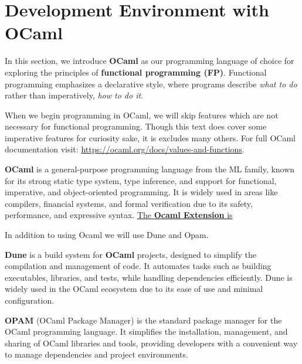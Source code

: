 
\newpage 
\section{Development Environment with OCaml}

In this section, we introduce \textbf{OCaml} as our programming language of choice for exploring
the principles of \textbf{functional programming (FP)}. Functional programming emphasizes a declarative
style, where programs describe \textit{what to do} rather than imperatively, \textit{how to do it}.

When we begin programming in OCaml, we will skip features which are not necessary for 
functional programming. Though this text does cover some imperative features for curiosity sake, it is excludes 
many others. For full OCaml documentation visit: \href{https://ocaml.org/docs/values-and-functions}{https://ocaml.org/docs/values-and-functions}.


\begin{Def}[OCaml]

	\textbf{OCaml} is a general-purpose programming language from the ML family,
	known for its strong static type system, type inference, and support for functional,
	imperative, and object-oriented programming. It is widely used in areas like compilers,
	financial systems, and formal verification due to its safety, performance,
	and expressive syntax. \underline{ The \textbf{Ocaml Extension} is }
\end{Def}

\noindent
In addition to using Ocaml we will use Dune and Opam.
\begin{Def}[Dune]

	\textbf{Dune} is a build system for \textbf{OCaml} projects, designed to simplify
	the compilation and management of code. It automates tasks such as building executables,
	libraries, and tests, while handling dependencies efficiently. Dune is widely used in the
	OCaml ecosystem due to its ease of use and minimal configuration.

\end{Def}

\begin{Def}[OPAM]

	\textbf{OPAM} (OCaml Package Manager) is the standard package manager for the OCaml programming
	language. It simplifies the installation, management, and sharing of OCaml libraries and tools,
	providing developers with a convenient way to manage dependencies and project environments.
\end{Def}

